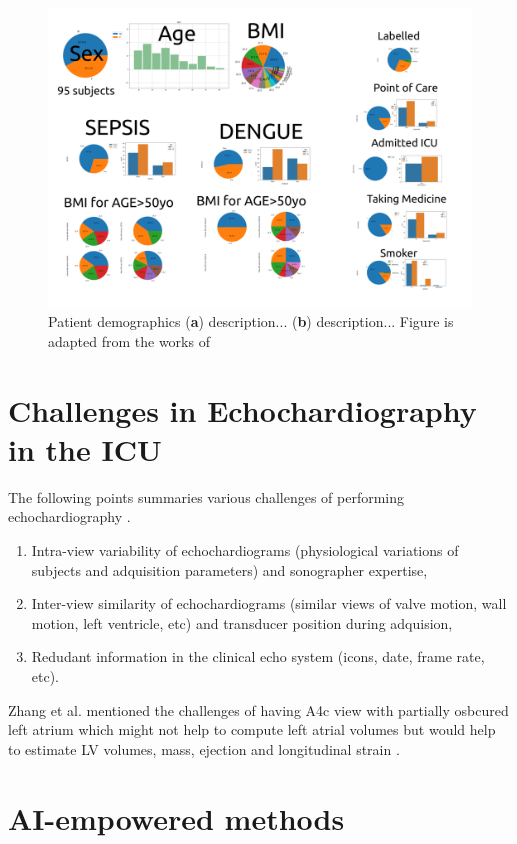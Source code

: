 \begin{figure}[h]
\includegraphics[width=\columnwidth]{../figures/patient-demographics-and-diseases/versions/drawing-v00}
\caption{
	Patient demographics
	(\textbf{a}) description...
	(\textbf{b}) description...
	Figure is adapted from the works of %
}
\end{figure}




\section{Challenges in Echochardiography in the ICU}
The following points summaries various challenges of performing echochardiography \cite{khamis2017}.
\begin{enumerate}
  \item Intra-view variability of echochardiograms (physiological variations of subjects and adquisition parameters) and sonographer expertise,
  \item Inter-view similarity of echochardiograms (similar views of valve motion, wall motion, left ventricle, etc) and transducer position during adquision,
  \item Redudant information in the clinical echo system (icons, date, frame rate, etc).
\end{enumerate}
Zhang et al. mentioned the challenges of having A4c view with partially osbcured left atrium which might not help to compute left atrial volumes but would help to estimate LV volumes, mass, ejection and longitudinal strain \cite{zhang2018}.




\section{AI-empowered methods}

